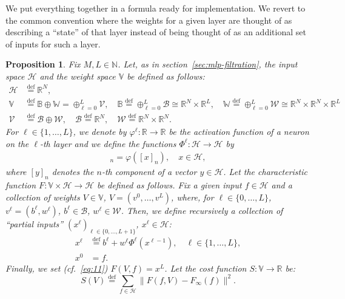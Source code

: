 \documentclass[10pt, a4paper]{article}
\theoremstyle{plain}
\newtheorem{proposition}[theorem]{Proposition}
\theoremstyle{definition}
\theoremstyle{definition}
\theoremstyle{definition}
\theoremstyle{definition}
\theoremstyle{definition}
\theoremstyle{definition}
\theoremstyle{definition}
\theoremstyle{remark}
\theoremstyle{remark}
\theoremstyle{rudin-style-generic}
\theoremstyle{rudin-style-generic*}
\theoremstyle{rudin-style-theorem}
\newcommand{\deq}{\stackrel{\mathrm{def}}{=}}
\newcommand{\NN}{\mathbb N}
\newcommand{\RR}{\mathbb R}
\begin{document}
  We put everything together in a formula ready for implementation.
  We revert to the common convention where the weights for a given layer are thought of as describing a ``state'' of that layer
  instead of being thought of as an additional set of inputs for such a layer.
  \begin{proposition}
    Fix $M,L\in\NN$.
    Let, as in section~\ref{sec:mlp-filtration}, the input space $\mathcal H$ and the weight space $\mathbb V$ be defined as follows:
    \begin{align*}
      \mathcal H &\deq \RR^N,\\
      \mathbb V &\deq \mathbb B \oplus \mathbb W = \oplus_{\ell=0}^L\mathcal V,
                  \quad \mathbb B \deq \oplus_{\ell=0}^L \mathcal B \cong \RR^N\times \RR^L ,
                  \quad  \mathbb W \deq \oplus_{\ell=0}^L \mathcal W \cong \RR^N\times\RR^N\times \RR^L\\
      \mathcal V &\deq \mathcal B \oplus\mathcal W, \quad \mathcal B \deq \RR^N , \quad   \mathcal W \deq \RR^N\times\RR^N
                  .
    \end{align*}
    For $\ell\in\{1,\dots,L\}$, we denote by $\varphi^\ell:\RR\rightarrow\RR$ be the activation function
    of a neuron on the $\ell$-th layer and we define the functions $\Phi^\ell:\mathcal H\rightarrow\mathcal H$ by
    \begin{align*}
      [\Phi^\ell( x )]_n = \varphi ([x]_n) , \quad x\in\mathcal H
      ,
    \end{align*}
    where $[y]_n$ denotes the $n$-th component of a vector $y\in\mathcal H$.
    Let the characteristic  function
    $F:\mathbb V\times \mathcal  H \rightarrow \mathcal H$
    be defined as follows.
    Fix a given input $f\in\mathcal H$ and a collection of weights $V\in\mathbb V$,
    $V = (v^0,\dots,v^L)$, where,
    for $\ell\in\{0,\dots,L\}$,
    $v^\ell = (b^\ell,w^\ell)$, $b^\ell\in\mathcal B$, $w^\ell\in\mathcal W$.
    Then, we define recursively a collection of ``partial inputs''
    $(x^\ell)_{\ell\in\{0,\dots,L+1\}}$, $x^\ell\in\mathcal H$:
    \begin{equation}  \label{eq:19}
      \begin{aligned}
        x^{\ell} &\deq b^\ell + w^\ell \Phi^\ell ( x^{\ell-1} ),\quad \ell \in \{ 1,\dots , L\} , \\
        x^{0} &= f
                .
      \end{aligned}
    \end{equation}
    Finally, we set (cf.~\eqref{eq:11}) $ F(V,f) = x^{L}$.
    Let the cost function $S:\mathbb V \rightarrow\RR$ be:
    \begin{equation*}
      S(V) \deq \sum_{f\in\mathcal H} \|F(f,V) - F_{\infty}(f ) \|^2
      .
    \end{equation*}
    

\end{proposition}
\end{document}
